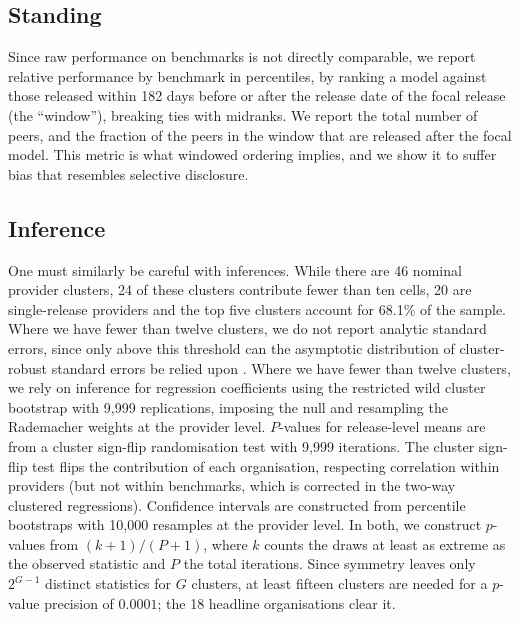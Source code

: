 \subsection{Standing}\label{sec:data-standing}

Since raw performance on benchmarks is not directly comparable, we report relative performance by benchmark in percentiles, by ranking a model against those released within 182 days before or after the release date of the focal release (the ``window''), breaking ties with midranks. We report the total number of peers, and the fraction of the peers in the window that are released after the focal model. This metric is what windowed ordering implies, and we show it to suffer bias that resembles selective disclosure.

\subsection{Inference}\label{sec:data-inference}
One must similarly be careful with inferences. While there are 46 nominal provider clusters, 24 of these clusters contribute fewer than ten cells, 20 are single-release providers and the top five clusters account for 68.1\% of the sample. Where we have fewer than twelve clusters, we do not report analytic standard errors, since only above this threshold can the asymptotic distribution of cluster-robust standard errors be relied upon \citep{cameron2008}. Where we have fewer than twelve clusters, we rely on inference for regression coefficients using the restricted wild cluster bootstrap with 9{,}999 replications, imposing the null and resampling the Rademacher weights at the provider level. $P$-values for release-level means are from a cluster sign-flip randomisation test with 9{,}999 iterations. The cluster sign-flip test flips the contribution of each organisation, respecting correlation within providers (but not within benchmarks, which is corrected in the two-way clustered regressions). Confidence intervals are constructed from percentile bootstraps with 10,000 resamples at the provider level. In both, we construct $p$-values from $(k+1)/(P+1)$, where $k$ counts the draws at least as extreme as the observed statistic and $P$ the total iterations. Since symmetry leaves only $2^{G-1}$ distinct statistics for $G$ clusters, at least fifteen clusters are needed for a $p$-value precision of $0.0001$; the 18 headline organisations clear it.
